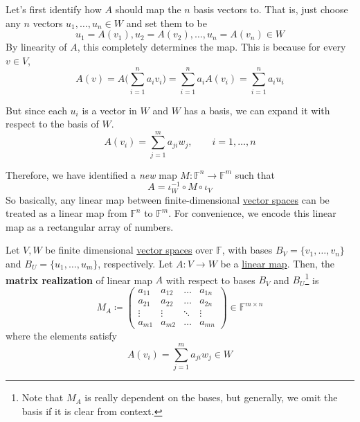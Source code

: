 	Let's first identify how $A$ should map the $n$ basis vectors to. That is, just choose any $n$ vectors $u_1, \ldots, u_n \in W$ and set them to be 
	\begin{equation}
	  u_1 = A(v_1), u_2 = A(v_2), \ldots, u_n = A(v_n) \in W
	\end{equation}
	By linearity of $A$, this completely determines the map. This is because for every $v \in V$, 
	\begin{equation}
		A(v) = A \bigg( \sum_{i=1}^n a_i v_i \bigg) = \sum_{i=1}^n a_i A(v_i) = \sum_{i=1}^n a_i u_i
	\end{equation}

	But since each $u_i$ is a vector in $W$ and $W$ has a basis, we can expand it with respect to the basis of $W$. 
	\begin{equation}
		A(v_i) = \sum_{j=1}^m a_{ji} w_j, \qquad i = 1, \ldots, n
	\end{equation} 

	Therefore, we have identified a \textit{new} map $M: \mathbb{F}^n \to \mathbb{F}^m$ such that 
	\begin{equation}
		A = \iota_W^{-1} \circ M \circ \iota_V
	\end{equation} 
	So basically, any linear map between finite-dimensional \hyperref[def:vector-space]{vector spaces} can be treated as a linear map from $\mathbb{F}^n$ to $\mathbb{F}^m$. For convenience, we encode this linear map as a rectangular array of numbers. 

	\begin{definition}[Matrix]
	  \label{def:matrix}
		Let $V, W$ be finite dimensional \hyperref[def:vector-space]{vector spaces} over $\mathbb{F}$, with bases $B_V = \{v_1, \ldots, v_n\}$ and $B_U = \{u_1, \ldots, u_m\}$, respectively. Let $A: V \to W$ be a \hyperref[def:linear_map]{linear map}. Then, the \textbf{matrix realization} of linear map $A$ with respect to bases $B_V$ and $B_U$\footnote{Note that $M_A$ is really dependent on the bases, but generally, we omit the basis if it is clear from context.} is 
		\begin{equation}
			M_A \coloneqq \begin{pmatrix}
				a_{11} & a_{12} & \ldots & a_{1n} \\ 
				a_{21} & a_{22} & \ldots & a_{2n} \\ 
				\vdots & \vdots & \ddots & \vdots \\ 
				a_{m1} & a_{m2} & \ldots & a_{mn} 
			\end{pmatrix} \in \mathbb{F}^{m \times n}
		\end{equation} 
		where the elements satisfy 
		\begin{equation}
			A(v_i) = \sum_{j=1}^m a_{ji} w_j \in W
		\end{equation}
	\end{definition}

